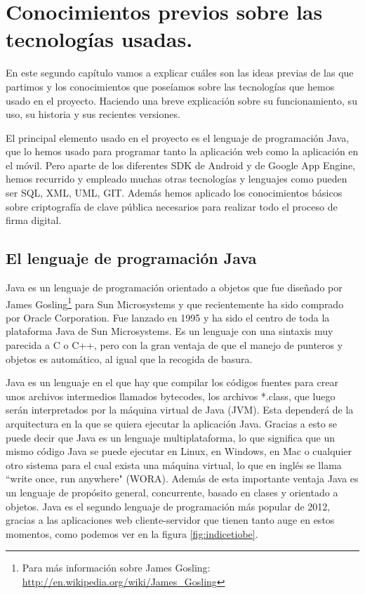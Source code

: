 \chapter[Conocimientos previos]{Conocimientos previos sobre las tecnologías usadas.}\label{cap:conocimientos}

En este segundo capítulo vamos a explicar cuáles son las ideas previas de las que partimos y los conocimientos que poseíamos sobre las tecnologías que hemos usado en el proyecto. Haciendo una breve explicación sobre su funcionamiento, su uso, su historia y sus recientes versiones.

El principal elemento usado en el proyecto es el lenguaje de programación Java, que lo hemos usado para programar tanto la aplicación web como la aplicación en el móvil. Pero aparte de los diferentes SDK de Android y de Google App Engine, hemos recurrido y empleado muchas otras tecnologías y lenguajes como pueden ser SQL, XML, UML, GIT. Además hemos aplicado los conocimientos básicos sobre criptografía de clave pública necesarios para realizar todo el proceso de firma digital.   

\section{El lenguaje de programación Java}

Java es un lenguaje de programación orientado a objetos que fue diseñado por James Gosling\footnote{Para más información sobre James Gosling: \url{http://en.wikipedia.org/wiki/James\_Gosling}} para Sun Microsystems y que recientemente ha sido comprado por Oracle Corporation. Fue lanzado en 1995 y ha sido el centro de toda la plataforma Java de Sun Microsystems. Es un lenguaje con una sintaxis muy parecida a C o C++, pero con la gran ventaja de que el manejo de punteros y objetos es automático, al igual que la recogida de basura.

Java es un lenguaje en el que hay que compilar los códigos fuentes para crear unos archivos intermedios llamados bytecodes, los archivos *.class, que luego serán interpretados por la máquina virtual de Java (JVM). Esta dependerá de la arquitectura en la que se quiera ejecutar la aplicación Java. Gracias a esto se puede decir que Java es un lenguaje multiplataforma, lo que significa que un mismo código Java se puede ejecutar en Linux, en Windows, en Mac o cualquier otro sistema para el cual exista una máquina virtual, lo que en inglés se llama ``write once, run anywhere" (WORA). Además de esta importante ventaja Java es un lenguaje de propósito general, concurrente, basado en clases y orientado a objetos. Java es el segundo lenguaje de programación más popular de 2012, gracias a las aplicaciones web cliente-servidor que tienen tanto auge en estos momentos, como podemos ver en la figura \ref{fig:indicetiobe}.


